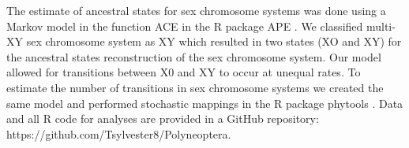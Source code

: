 The estimate of ancestral states for sex chromosome systems was done using a Markov model in the function ACE in the R package APE \citep{Paradis2018}.
We classified multi-XY sex chromosome system as XY which resulted in two states (XO and XY) for the ancestral states reconstruction of the sex chromosome system. 
Our model allowed for transitions between X0 and XY to occur at unequal rates.
To estimate the number of transitions in sex chromosome systems we created the same model and performed stochastic mappings in the R package phytools \citep{revell2012phytools}.
Data and all R code for analyses are provided in a GitHub repository: https://github.com/Tsylvester8/Polyneoptera. %

